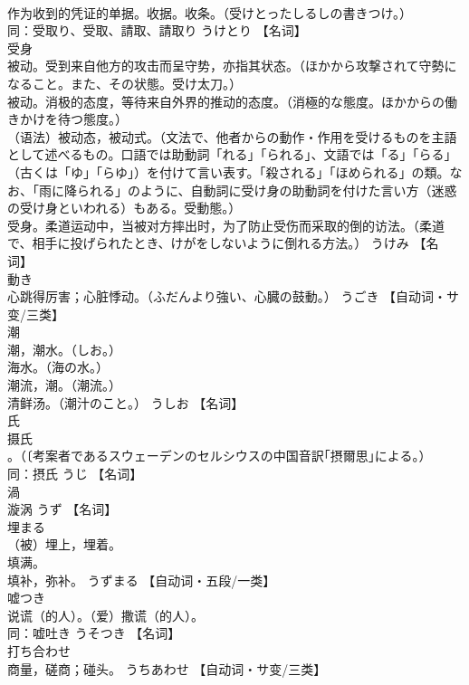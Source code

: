 \documentclass[8pt]{extreport}
\begin{document}
\begin{CJK}{UTF8}{min}
\\	作为收到的凭证的单据。收据。收条。（受けとったしるしの書きつけ。） 
\\	同：受取り、受取、請取、請取り	うけとり		【名词】
\\	受身	
\\	被动。受到来自他方的攻击而呈守势，亦指其状态。（ほかから攻撃されて守勢になること。また、その状態。受け太刀。） 
\\	被动。消极的态度，等待来自外界的推动的态度。（消極的な態度。ほかからの働きかけを待つ態度。） 
\\	（语法）被动态，被动式。（文法で、他者からの動作・作用を受けるものを主語として述べるもの。口語では助動詞「れる」「られる」、文語では「る」「らる」（古くは「ゆ」「らゆ」）を付けて言い表す。「殺される」「ほめられる」の類。なお、「雨に降られる」のように、自動詞に受け身の助動詞を付けた言い方（迷惑の受け身といわれる）もある。受動態。） 
\\	受身。柔道运动中，当被对方摔出时，为了防止受伤而采取的倒的访法。（柔道で、相手に投げられたとき、けがをしないように倒れる方法。）	うけみ		【名词】
\\	動き	
\\	心跳得厉害；心脏悸动。（ふだんより強い、心臓の鼓動。）	うごき		【自动词・サ变/三类】
\\	潮	
\\	潮，潮水。（しお。） 
\\	海水。（海の水。） 
\\	潮流，潮。（潮流。） 
\\	清鲜汤。（潮汁のこと。）	うしお		【名词】
\\	氏	
\\	摄氏
\\	。（〔考案者であるスウェーデンのセルシウスの中国音訳｢摂爾思｣による。） 
\\	同：摂氏	うじ		【名词】
\\	渦	
\\	漩涡	うず		【名词】
\\	埋まる	
\\	（被）埋上，埋着。 
\\	填满。 
\\	填补，弥补。	うずまる		【自动词・五段/一类】
\\	嘘つき	
\\	说谎（的人）。（爱）撒谎（的人）。 
\\	同：嘘吐き	うそつき		【名词】
\\	打ち合わせ	
\\	商量，磋商；碰头。	うちあわせ		【自动词・サ变/三类】

\end{CJK}
\end{document}
